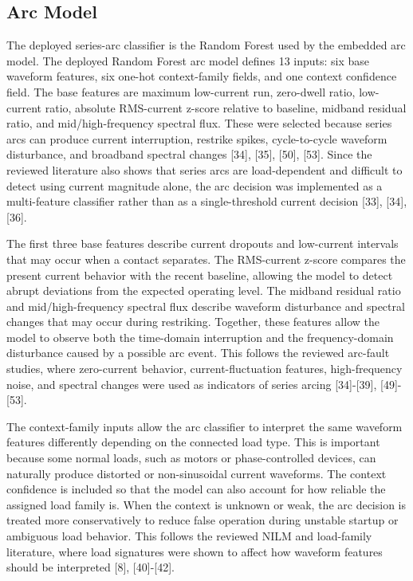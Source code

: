 \subsection{Arc Model}
\label{sec:ch3-arc-model}

The deployed series-arc classifier is the Random Forest used by the embedded
arc model. The deployed Random Forest arc model defines 13 inputs: six
base waveform features, six one-hot context-family fields, and one context
confidence field. The base features are maximum low-current run, zero-dwell
ratio, low-current ratio, absolute RMS-current z-score relative to baseline,
midband residual ratio, and mid/high-frequency spectral flux. These were
selected because series arcs can produce current interruption, restrike spikes,
cycle-to-cycle waveform disturbance, and broadband spectral changes [34],
[35], [50], [53]. Since the reviewed literature also shows that series arcs
are load-dependent and difficult to detect using current magnitude alone, the
arc decision was implemented as a multi-feature classifier rather than as a
single-threshold current decision [33], [34], [36].

The first three base features describe current dropouts and low-current
intervals that may occur when a contact separates. The RMS-current z-score
compares the present current behavior with the recent baseline, allowing the
model to detect abrupt deviations from the expected operating level. The
midband residual ratio and mid/high-frequency spectral flux describe waveform
disturbance and spectral changes that may occur during restriking. Together,
these features allow the model to observe both the time-domain interruption
and the frequency-domain disturbance caused by a possible arc event. This
follows the reviewed arc-fault studies, where zero-current behavior,
current-fluctuation features, high-frequency noise, and spectral changes were
used as indicators of series arcing [34]-[39], [49]-[53].

The context-family inputs allow the arc classifier to interpret the same
waveform features differently depending on the connected load type. This is
important because some normal loads, such as motors or phase-controlled
devices, can naturally produce distorted or non-sinusoidal current waveforms.
The context confidence is included so that the model can also account for how
reliable the assigned load family is. When the context is unknown or weak, the
arc decision is treated more conservatively to reduce false operation during
unstable startup or ambiguous load behavior. This follows the reviewed NILM
and load-family literature, where load signatures were shown to affect how
waveform features should be interpreted [8], [40]-[42].

